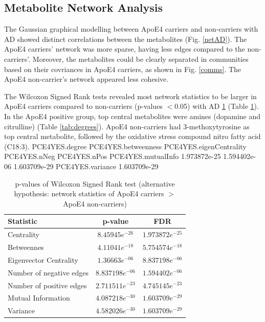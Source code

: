 \documentclass{amsart}
\begin{document}
\subsection{Metabolite Network Analysis}
The Gaussian graphical modelling between ApoE4 carriers and non-carriers with AD showed distinct correlations between the metabolites (Fig. \ref{netAD}). The ApoE4 carriers' network was more sparse, having less edges compared to the non-carriers'.  Moreover, the metabolites could be clearly separated in communities based on their covriances in ApoE4 carriers, as shown in Fig. \ref{comms}. The ApoE4 non-carrier's network appeared less cohesive.

The Wilcoxon Signed Rank tests revealed most network statistics to be larger in ApoE4 carriers compared to non-carriers (p-values $<$0.05) with AD \ref{tab:netstats} (Table \ref{tab:netstats}). In the ApoE4 positive group, top central metabolites were amines (dopamine and citrulline) (Table \ref{tab:degrees}). ApoE4 non-carriers had 3-methoxytyrosine as top central metabolite, followed by the oxidative stress compound nitro fatty acid (C18:3).
PCE4YES.degree     PCE4YES.betweenness PCE4YES.eigenCentrality            PCE4YES.nNeg            PCE4YES.nPos      PCE4YES.mutualInfo 
           1.973872e-25                       1.594402e-06                                    1.603709e-29 
       PCE4YES.variance 
           1.603709e-29 
\begin{table}[H]
  \caption{\label{tab:netstats} p-values of Wilcoxon Signed Rank test (alternative hypothesis: network statistics of ApoE4 carriers $>$ ApoE4 non-carriers)}
  \begin{tabular}{lcc}
  \toprule
  Statistic & p-value & FDR \\ \midrule
  Centrality                   & $8.45945e^{-26}$ & $1.973872e^{-25}$     \\
  Betweennes                   & $4.11041e^{-18}$ & $5.754574e^{-18}$     \\
  Eigenvector Centrality       & $1.36663e^{-06}$ & $8.837198e^{-06}$    \\
  Number of negative edges     & $8.837198e^{-06}$ & $1.594402e^{-06}$     \\
  Number of positive edges     & $2.711511e^{-23}$ & $4.745145e^{-23}$     \\
  Mutual Information           & $4.087218e^{-30}$ & $1.603709e^{-29}$       \\
  Variance                     & $4.582026e^{-30}$ & $1.603709e^{-29}   $    \\ \bottomrule
  \end{tabular}
  \end{table}
\end{document}
